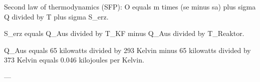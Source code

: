 Second law of thermodynamics (SFP):  
O equals m times (se minus sa) plus sigma Q divided by T plus sigma S_erz.  

S_erz equals Q_Aus divided by T_KF minus Q_Aus divided by T_Reaktor.  

Q_Aus equals 65 kilowatts divided by 293 Kelvin minus 65 kilowatts divided by 373 Kelvin equals 0.046 kilojoules per Kelvin.  

---
